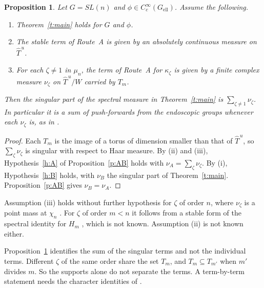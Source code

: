 \documentclass[12pt,letterpaper]{article}
\numberwithin{equation}{section}
\theoremstyle{plain}
\newtheorem{proposition}[theorem]{Proposition}
\theoremstyle{definition}
\theoremstyle{remark}
\newcommand{\Thu}{\widehat{T}^{\,u}}
\newcommand{\ellr}{\mathrm{ell}}
\begin{document}
\begin{proposition}\label{p:Dreduction}
Let $G=SL(n)$ and $\phi\in C_c^\infty(G_{\ellr})$. Assume the following.
\begin{enumerate}[label=(\roman*)]
\item Theorem~\ref{t:main} holds for $G$ and $\phi$.
\item The stable term of Route~A is given by an absolutely continuous measure on $\Thu$.
\item For each $\zeta\ne1$ in $\mu_n$, the term of Route~A for $\kappa_\zeta$ is given by a finite complex measure $\nu_\zeta$ on $\Thu/W$ carried by $T_m$.
\end{enumerate}
Then the singular part of the spectral measure in Theorem~\ref{t:main} is $\sum_{\zeta\ne1}\nu_\zeta$. In particular it is a sum of push-forwards from the endoscopic groups whenever each $\nu_\zeta$ is, as in \cite[Prop.~5.2]{JC26}.
\end{proposition}

\begin{proof}
Each $T_m$ is the image of a torus of dimension smaller than that of $\Thu$, so $\sum_\zeta\nu_\zeta$ is singular with respect to Haar measure. By (ii) and (iii), Hypothesis~\ref{h:A} of Proposition~\ref{p:AB} holds with $\nu_A=\sum_\zeta\nu_\zeta$. By (i), Hypothesis~\ref{h:B} holds, with $\nu_B$ the singular part of Theorem~\ref{t:main}. Proposition~\ref{p:AB} gives $\nu_B=\nu_A$.
\end{proof}

Assumption (iii) holds without further hypothesis for $\zeta$ of order $n$, where $\nu_\zeta$ is a point mass at $\chi_n$ \cite[Prop.~5.1]{JC26}. For $\zeta$ of order $m<n$ it follows from a stable form of the spectral identity for $H_m$ \cite[Prop.~5.2]{JC26}, which is not known. Assumption (ii) is not known either.

Proposition~\ref{p:Dreduction} identifies the sum of the singular terms and not the individual terms. Different $\zeta$ of the same order share the set $T_m$, and $T_m\subseteq T_{m'}$ when $m'$ divides $m$. So the supports alone do not separate the terms. A term-by-term statement needs the character identities of \cite{Ar96}.
\end{document}
